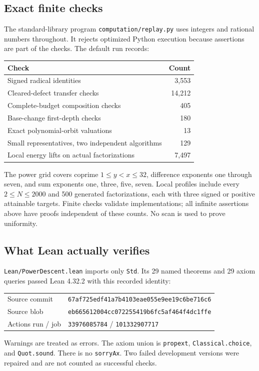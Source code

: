 \subsection{Exact finite checks}
The standard-library program \texttt{computation/replay.py} uses integers
and rational numbers throughout. It rejects optimized Python execution
because assertions are part of the checks. The default run records:
\begin{center}
\begin{tabular}{lr}\toprule
Check & Count\\\midrule
Signed radical identities & 3,553\\
Cleared-defect transfer checks & 14,212\\
Complete-budget composition checks & 405\\
Base-change first-depth checks & 180\\
Exact polynomial-orbit valuations & 13\\
Small representatives, two independent algorithms & 129\\
Local energy lifts on actual factorizations & 7,497\\\bottomrule
\end{tabular}
\end{center}
The power grid covers coprime $1\le y<x\le32$, difference exponents one
through seven, and sum exponents one, three, five, seven. Local profiles
include every $2\le N\le2000$ and 500 generated factorizations, each with
three signed or positive attainable targets. Finite checks validate
implementations; all infinite assertions above have proofs independent
of these counts. No scan is used to prove uniformity.

\subsection{What Lean actually verifies}
\texttt{Lean/PowerDescent.lean} imports only \texttt{Std}. Its 29 named
theorems and 29 axiom queries passed Lean 4.32.2 with this recorded identity:
\begin{center}\small
\begin{tabular}{ll}
Source commit & \texttt{67af725edf41a7b4103eae055e9ee19c6be716c6}\\
Source blob & \texttt{eb665612004cc072255419b6fc5af464f4dc1ffe}\\
Actions run / job & \texttt{33976085784} / \texttt{101332907717}
\end{tabular}\end{center}
Warnings are treated as errors. The axiom union is
\texttt{propext}, \texttt{Classical.choice}, and \texttt{Quot.sound}.
There is no \texttt{sorryAx}. Two failed development versions were repaired
and are not counted as successful checks.

